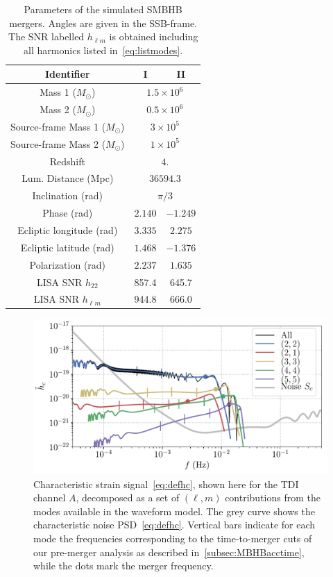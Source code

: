 \documentclass[aps,showpacs,twocolumn,prd,superscriptaddress,nofootinbib]{revtex4-1}
\newcommand{\Msol}{M_{\odot}}
\begin{document}
\begin{table}
	\begin{tabular}{|c||c|c|}
		\hline
		Identifier 		& I 	& II   \\
		\hline
		\hline
		Mass 1 ($\Msol$) 	& \multicolumn{2}{|c|}{$1.5\times10^{6}$} \\
		\hline
		Mass 2 ($\Msol$) 	&  \multicolumn{2}{|c|}{$0.5\times10^{6}$}\\
		\hline
		Source-frame Mass 1 ($\Msol$) 	& \multicolumn{2}{|c|}{$3\times10^{5}$} \\
		\hline
		Source-frame Mass 2 ($\Msol$) 	&  \multicolumn{2}{|c|}{$1\times10^{5}$}\\
		\hline
		Redshift 		&  \multicolumn{2}{|c|}{$4.$}  \\
		\hline
		Lum. Distance (Mpc) 		&  \multicolumn{2}{|c|}{$36594.3$} \\
		\hline
		Inclination (rad) 		& \multicolumn{2}{|c|}{$\pi/3$}  \\
		\hline
		Phase (rad) 			& $2.140$	& $-1.249$ \\
		\hline
		Ecliptic longitude (rad) 			& $3.335$	& $2.275$ \\
		\hline
		Ecliptic latitude (rad) 			& $1.468$	& $-1.376$ \\
		\hline
		Polarization (rad) 			& $2.237$	& $1.635$ \\
		\hline
		\hline
		LISA SNR $h_{22}$			& 857.4 & 645.7 \\
		\hline
		LISA SNR $h_{\ell m}$			& 944.8 & 666.0 \\
		\hline
	\end{tabular}
	\caption{Parameters of the simulated SMBHB mergers. Angles are given in the SSB-frame. The $\mathrm{SNR}$ labelled $h_{\ell m}$ is obtained including all harmonics listed in~\eqref{eq:listmodes}.}
	\label{tab:MBHBparams}
\end{table} 

\begin{figure}
  \centering
  \includegraphics[width=.99\linewidth]{../plots/plot_hc_tdia_hm.pdf}
  \caption{Characteristic strain signal~\eqref{eq:defhc}, shown here for the TDI channel $A$, decomposed as a set of $(\ell,m)$ contributions from the modes available in the waveform model. The grey curve shows the characteristic noise PSD~\eqref{eq:defhc}. Vertical bars indicate for each mode the frequencies corresponding to the time-to-merger cuts of our pre-merger analysis as described in~\ref{subsec:MBHBacctime}, while the dots mark the merger frequency.}
  \label{fig:hctdiahm}
\end{figure}
\end{document}
